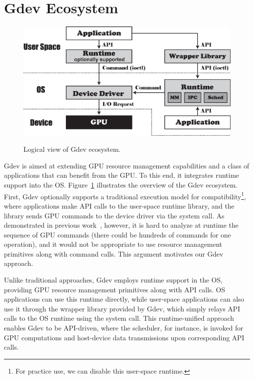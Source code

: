 \vspace{-0.25em}
\section{Gdev Ecosystem}
\label{sec:ecosystem}
\vspace{-0.25em}

\begin{figure}[t]
 \begin{center}
  \includegraphics[width=0.863\hsize]{eps/gdev.eps}\\
  \vspace{-0.5em}
  \caption{Logical view of Gdev ecosystem.}
  \label{fig:gdev}
 \end{center}
 \vspace{-1.5em}
\end{figure}

Gdev is aimed at extending GPU resource management capabilities and a
class of applications that can benefit from the GPU.
To this end, it integrates runtime support into the OS.
Figure~\ref{fig:gdev} illustrates the overview of the Gdev ecosystem.
First, Gdev optionally supports a traditional execution model for
compatibility\footnote{For practice use, we can disable this user-space
runtime.}, where
applications make API calls to the user-space runtime library, and the
library sends GPU commands to the device driver via the system call.
As demonstrated in previous work~\cite{Kato_ATC11}, however, it is hard
to analyze at runtime the sequence of GPU commands (there could be
hundreds of commands for one operation), and it would not be appropriate
to use resource management primitives along with command calls.
This argument motivates our Gdev approach.

Unlike traditional approaches, Gdev employs runtime support in
the OS, providing GPU resource management primitives along with API calls.
OS applications can use this runtime directly, while user-space
applications can also use it through the wrapper library provided by
Gdev, which simply relays API calls to the OS runtime using the system
call.
This runtime-unified approach enables Gdev to be API-driven, where the
scheduler, for instance, is invoked for GPU computations and host-device
data transmissions upon corresponding API calls.

